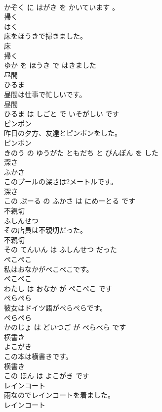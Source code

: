 \documentclass[8pt]{extreport}
\begin{document}
\begin{CJK}{UTF8}{min}
\\	かぞく に はがき を かいています 。			
\\	掃く	
\\	はく			
\\	床をほうきで掃きました。	
\\	床 
\\	掃く 
\\	ゆか を ほうき で はきました			
\\	昼間	
\\	ひるま			
\\	昼間は仕事で忙しいです。	
\\	昼間 
\\	ひるま は しごと で いそがしい です			
\\	ピンポン	
\\	昨日の夕方、友達とピンポンをした。	
\\	ピンポン 
\\	きのう の ゆうがた ともだち と ぴんぽん を した			
\\	深さ	
\\	ふかさ			
\\	このプールの深さは2メートルです。	
\\	深さ 
\\	この ぷーる の ふかさ は にめーとる です			
\\	不親切	
\\	ふしんせつ			
\\	その店員は不親切だった。	
\\	不親切 
\\	その てんいん は ふしんせつ だった			
\\	ぺこぺこ	
\\	私はおなかがぺこぺこです。	
\\	ぺこぺこ 
\\	わたし は おなか が ぺこぺこ です			
\\	ぺらぺら	
\\	彼女はドイツ語がぺらぺらです。	
\\	ぺらぺら 
\\	かのじょ は どいつご が ぺらぺら です			
\\	横書き	
\\	よこがき			
\\	この本は横書きです。	
\\	横書き 
\\	この ほん は よこがき です			
\\	レインコート	
\\	雨なのでレインコートを着ました。	
\\	レインコート 

\end{CJK}
\end{document}
